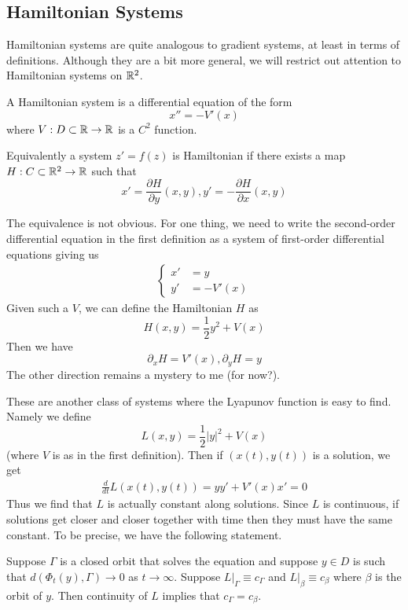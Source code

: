 \subsection{Hamiltonian Systems}
Hamiltonian systems are quite analogous to gradient systems, at least in terms of definitions. Although they are a bit more general, we will restrict out attention to Hamiltonian systems on $\mathbb{R}^2$.
\begin{definition}
A Hamiltonian system is a differential equation of the form 
$$x'' = - V'(x)$$
where $V: D \subset \mathbb{R} \to \mathbb{R}$ is a $C^2$ function.

Equivalently a system $z' = f(z)$ is Hamiltonian if there exists a map $H: C \subset \mathbb{R}^2 \to \mathbb{R}$ such that 
$$ x' = \frac{\partial H}{\partial y}(x, y), y' = -\frac{\partial H}{\partial x}(x, y) $$
\end{definition}    
\begin{remark}
    The equivalence is not obvious. For one thing, we need to write the second-order differential equation in the first definition as a system of first-order differential equations giving us 
    \begin{align*}
        \begin{cases}
            x' &= y\\
            y' &= - V'(x)
        \end{cases}
    \end{align*}
    Given such a $V$, we can define the Hamiltonian $H$ as 
    $$ H(x, y) = \frac{1}{2} y^2 + V(x) $$
    Then we have 
    $$ \partial_x H = V'(x), \partial_y H = y $$
    The other direction remains a mystery to me (for now?).\\
\end{remark}

These are another class of systems where the Lyapunov function is easy to find. Namely we define
$$ L(x, y) = \frac{1}{2} |y|^2 + V(x) $$
(where $V$ is as in the first definition). Then if $(x(t), y(t))$ is a solution, we get
\begin{align*}
    \frac{d}{dt} L(x(t), y(t)) = y y' + V'(x) x' = 0
\end{align*}
Thus we find that $L$ is actually constant along solutions. Since $L$ is continuous, if solutions get closer and closer together with time then they must have the same constant. To be precise, we have the following statement.

Suppose $\Gamma$ is a closed orbit that solves the equation and suppose $y \in D$ is such that $d(\Phi_t(y), \Gamma) \to 0$ as $t \to \infty$. Suppose $L|_{\Gamma} \equiv c_\Gamma$ and $L|_{\beta} \equiv c_\beta$ where $\beta$ is the orbit of $y$. Then continuity of $L$ implies that $c_\Gamma = c_{\beta}$.

